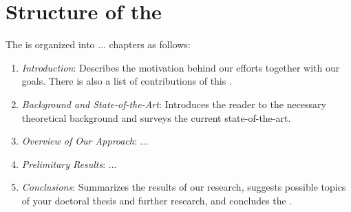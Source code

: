 \section{Structure of the \Thesis{}}
The \thesis{} is organized into ... chapters as follows:
\begin{enumerate}
\item \emph{Introduction}: Describes the motivation behind our efforts together with our goals. There is also a list of contributions of this \thesis. 

\item \emph{Background and State-of-the-Art}: Introduces the reader to the necessary theoretical background and surveys the current state-of-the-art.

\item \emph{Overview of Our Approach}: ...

\item \emph{Prelimitary Results}: ...

\item \emph{Conclusions}: Summarizes the results of our research, suggests possible topics of your doctoral thesis and further research, and concludes the \thesis.
\end{enumerate} 
